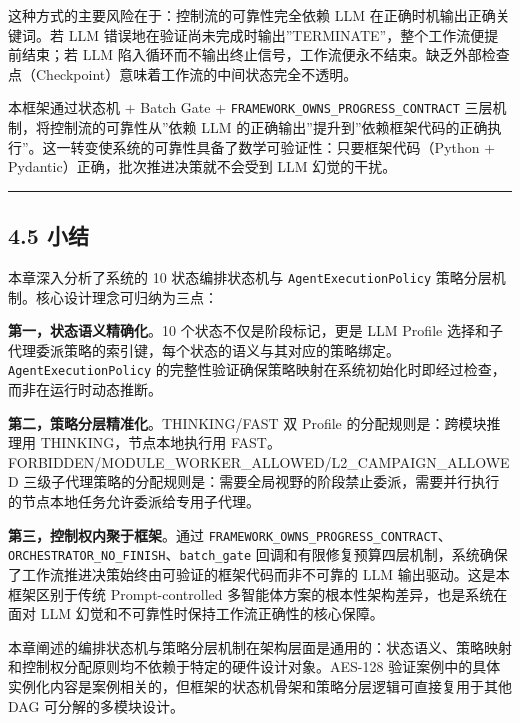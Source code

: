 这种方式的主要风险在于：控制流的可靠性完全依赖 LLM
在正确时机输出正确关键词。若 LLM
错误地在验证尚未完成时输出''TERMINATE''，整个工作流便提前结束；若 LLM
陷入循环而不输出终止信号，工作流便永不结束。缺乏外部检查点（Checkpoint）意味着工作流的中间状态完全不透明。

本框架通过状态机 + Batch Gate +
\texttt{FRAMEWORK\_OWNS\_PROGRESS\_CONTRACT}
三层机制，将控制流的可靠性从''依赖 LLM
的正确输出''提升到''依赖框架代码的正确执行''。这一转变使系统的可靠性具备了数学可验证性：只要框架代码（Python
+ Pydantic）正确，批次推进决策就不会受到 LLM 幻觉的干扰。

\begin{center}\rule{0.5\linewidth}{0.5pt}\end{center}

\subsection{4.5 小结}\label{ux5c0fux7ed3}

本章深入分析了系统的 10 状态编排状态机与 \texttt{AgentExecutionPolicy}
策略分层机制。核心设计理念可归纳为三点：

\textbf{第一，状态语义精确化}。10 个状态不仅是阶段标记，更是 LLM Profile
选择和子代理委派策略的索引键，每个状态的语义与其对应的策略绑定。\texttt{AgentExecutionPolicy}
的完整性验证确保策略映射在系统初始化时即经过检查，而非在运行时动态推断。

\textbf{第二，策略分层精准化}。THINKING/FAST 双 Profile
的分配规则是：跨模块推理用 THINKING，节点本地执行用
FAST。FORBIDDEN/MODULE\_WORKER\_ALLOWED/L2\_CAMPAIGN\_ALLOWED
三级子代理策略的分配规则是：需要全局视野的阶段禁止委派，需要并行执行的节点本地任务允许委派给专用子代理。

\textbf{第三，控制权内聚于框架}。通过
\texttt{FRAMEWORK\_OWNS\_PROGRESS\_CONTRACT}、\texttt{ORCHESTRATOR\_NO\_FINISH}、\texttt{batch\_gate}
回调和有限修复预算四层机制，系统确保了工作流推进决策始终由可验证的框架代码而非不可靠的
LLM 输出驱动。这是本框架区别于传统 Prompt-controlled
多智能体方案的根本性架构差异，也是系统在面对 LLM
幻觉和不可靠性时保持工作流正确性的核心保障。

本章阐述的编排状态机与策略分层机制在架构层面是通用的：状态语义、策略映射和控制权分配原则均不依赖于特定的硬件设计对象。AES-128
验证案例中的具体实例化内容是案例相关的，但框架的状态机骨架和策略分层逻辑可直接复用于其他
DAG 可分解的多模块设计。
